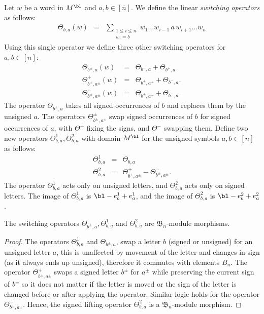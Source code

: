 \documentclass[11pt]{report}
\begin{document}
\begin{defn}
	\label{chpt6:def:swtich}
	Let $w$ be a word in $M^{\bl}$ and $a,b \in [\overline{n}]$. We define the linear 
	\emph{switching operators} as follows:
	\begin{eqnarray}
	\Theta_{b,a}(w) & = &\sum_{\substack{1 \leq i \leq n \\ w_{i} =b}} w_{1} \ldots  w_{i-1}  \,a \, w_{i+1} \ldots  
	w_{n} \label{eqn:switch1}
	\end{eqnarray}
	Using this single operator we define three other switching operators for $a,b \in [n]$:
	\begin{eqnarray}
	\Theta_{b^{\pm},a}(w) & = & \Theta_{b^{-},a} + \Theta_{b^{+},a}	\label{eqn:switch2}\\
	\Theta_{b^{\pm},a^{\pm}}^{+} (w)& = & \Theta_{b^{+},a^{+}} + \Theta_{b^{-},a^{-}}	\label{eqn:switch3} \\
	\Theta_{b^{\pm},a^{\pm}}^{-} (w)& = & \Theta_{b^{+},a^{-}} + \Theta_{b^{-},a^{+}}	\label{eqn:switch4}
	\end{eqnarray}
	The operator $\Theta_{b^{\pm},a}$ takes all signed occurrences of $b$ and replaces them by the unsigned $a$. The operators $\Theta_{b^{ \pm},a^{\pm}}^{\pm}$ swap signed occurrences of $b$ for signed occurrences of $a$, with $\Theta^{+}$ fixing the signs, and $\Theta^{-}$ swapping them. Define two new operators $\Theta^{1}_{b,a},\Theta^{2}_{b,a}$  with domain $M^{\bl}$ for the unsigned symbols $a,b \in [n]$ as follows:
	\begin{eqnarray}
	\Theta^{1}_{b,a} & = & \Theta_{b,a} \\ 
	\Theta^{2}_{b,a} & = & \Theta_{b^{\pm},a^{\pm}}^{+} - \Theta_{b^{\pm},a^{\pm}}^{-}.
	\end{eqnarray}
	The operator $\Theta^{1}_{b,a}$ acts only on unsigned letters, and $\Theta^{2}_{b,a}$ acts only on signed letters.
	The image of $\Theta_{b,a}^{1}$ is $\bl - e_{b}^{1} + e_{a}^{1}$, and the image of $\Theta^{2}_{b,a}$ is $\bl -e_{b}^{2} + e_{a}^{2}$. 
\end{defn}

\begin{lemma}
	The switching operators $\Theta_{b^{\pm},a}, \Theta_{b,a}^{1}$ and $\Theta_{b,a}^{2}$ are $\mathfrak{B}_{n}$-module morphisms.
\end{lemma}
\begin{proof}
	The operators $\Theta_{b,a}^{1}$ and $\Theta_{b^{\pm},a}$, swap a letter $b$ (signed or unsigned) for an unsigned letter $a$, this is unaffected by movement of the letter and changes in sign (as it always ends up unsigned), therefore it commutes with elements $B_{n}$. The operator $\Theta^{+}_{b^\pm,a^\pm}$ swaps a signed letter $b^{\pm}$ for $a^{\pm}$ while preserving the current sign of $b^{\pm}$ so it does not matter if the letter is moved or the sign of the letter is changed before or after applying the operator. Similar logic holds for the operator $\Theta^{-}_{b^\pm,a^\pm}$.  Hence, the signed lifting operator $\Theta^{2}_{b,a}$ is a  $\mathfrak{B}_{n}$-module morphism.
\end{proof}
\end{document}
